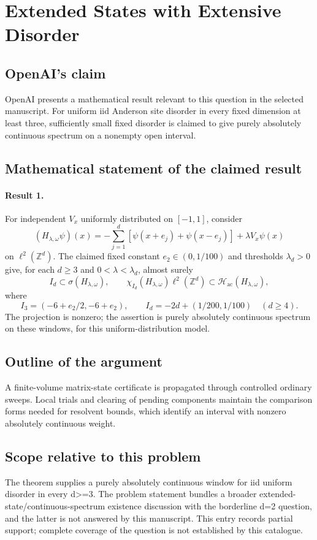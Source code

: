 \documentclass[11pt]{article}
\begin{document}
\section*{Extended States with Extensive Disorder}

\subsection{OpenAI's claim}
OpenAI presents a mathematical result relevant to this question in the selected manuscript. For uniform iid Anderson site disorder in every fixed dimension at least three, sufficiently small fixed disorder is claimed to give purely absolutely continuous spectrum on a nonempty open interval.

\subsection{Mathematical statement of the claimed result}
\paragraph{Result 1.} For independent \(V_x\) uniformly distributed on \([-1,1]\), consider
\[
 (H_{\lambda,\omega}\psi)(x)=-\sum_{j=1}^d[\psi(x+e_j)+\psi(x-e_j)]+\lambda V_x\psi(x)
\]
on \(\ell^2(\mathbb Z^d)\). The claimed fixed constant \(e_2\in(0,1/100)\) and thresholds \(\lambda_d>0\) give, for each \(d\ge3\) and \(0<\lambda<\lambda_d\), almost surely
\[
 I_d\subset\sigma(H_{\lambda,\omega}),\qquad
 \chi_{I_d}(H_{\lambda,\omega})\ell^2(\mathbb Z^d)\subset\mathcal H_{\mathrm{ac}}(H_{\lambda,\omega}),
\]
where
\[
 I_3=(-6+e_2/2,-6+e_2),\qquad
 I_d=-2d+(1/200,1/100)\quad(d\ge4).
\]
The projection is nonzero; the assertion is purely absolutely continuous spectrum on these windows, for this uniform-distribution model.

\subsection{Outline of the argument}
A finite-volume matrix-state certificate is propagated through controlled ordinary sweeps. Local trials and clearing of pending components maintain the comparison forms needed for resolvent bounds, which identify an interval with nonzero absolutely continuous weight.

\subsection{Scope relative to this problem}
The theorem supplies a purely absolutely continuous window for iid uniform disorder in every d>=3. The problem statement bundles a broader extended-state/continuous-spectrum existence discussion with the borderline d=2 question, and the latter is not answered by this manuscript. This entry records partial support; complete coverage of the question is not established by this catalogue.
\end{document}
